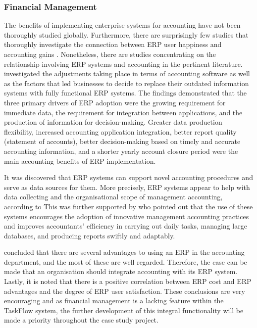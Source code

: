 \subsubsection{Financial Management}
\par{The benefits of implementing enterprise systems for accounting have not been thoroughly studied globally. Furthermore, there are surprisingly few studies that thoroughly investigate the connection between ERP user happiness and accounting gains \citep{kanellou2013accounting}. Nonetheless, there are studies concentrating on the relationship involving ERP systems and accounting in the pertinent literature. \cite{spathis2004enterprise} investigated the adjustments taking place in terms of accounting software as well as the factors that led businesses to decide to replace their outdated information systems with fully functional ERP systems. The findings demonstrated that the three primary drivers of ERP adoption were the growing requirement for immediate data, the requirement for integration between applications, and the production of information for decision-making. Greater data production flexibility, increased accounting application integration, better report quality (statement of accounts), better decision-making based on timely and accurate accounting information, and a shorter yearly account closure period were the main accounting benefits of ERP implementation.

It was discovered that ERP systems can support novel accounting procedures and serve as data sources for them. More precisely, ERP systems appear to help with data collecting and the organisational scope of management accounting, according to \cite{rom2006enterprise} This was further supported by \cite{spathis2004enterprise} who pointed out that the use of these systems encourages the adoption of innovative management accounting practices and improves accountants' efficiency in carrying out daily tasks, managing large databases, and producing reports swiftly and adaptably.

\cite{kanellou2013accounting} concluded that there are several advantages to using an ERP in the accounting department, and the most of these are well regarded. Therefore, the case can be made that an organisation should integrate accounting with its ERP system. Lastly, it is noted that there is a positive correlation between ERP cost and ERP advantages and the degree of ERP user satisfaction. These conclusions are very encouraging and as financial management is a lacking feature within the TaskFlow system, the further development of this integral functionality will be made a priority throughout the case study project.}
